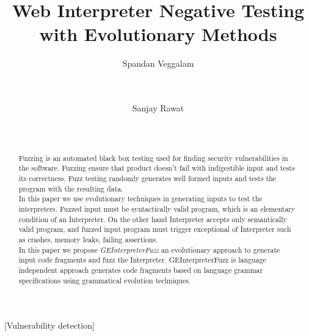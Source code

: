 \documentclass{sig-alternate}
\begin{document}
\title{Web Interpreter Negative Testing with Evolutionary Methods}


\author{
\alignauthor
Spandan Veggalam\\
       \\
       \\
\and
\alignauthor
Sanjay Rawat\\
       \\
       \\
}

\maketitle

\begin{abstract}
Fuzzing is an automated black box testing used for finding security vulnerabilities in the software. Fuzzing ensure that product doesn't fail with indigestible input and tests its correctness. Fuzz testing randomly generates well formed inputs and tests the program with the resulting data. \\ \indent In this paper we use evolutionary techniques in generating inputs to test the interpreters. Fuzzed input must be syntactically valid program, which is an elementary condition of an Interpreter. On the other hand Interpreter accepts only semantically valid program, and fuzzed input program must trigger exceptional  of Interpreter such as crashes, memory leaks, failing assertions.\\
\indent In this paper we propose \textit{GEInterpreterFuzz} an evolutionary approach to generate input code fragments and fuzz the Interpreter. GEInterpreterFuzz is language independent approach generates code fragments based on language grammar specifications using grammatical evolution techniques. 
\end{abstract}

[Vulnerability detection]
\end{document}
